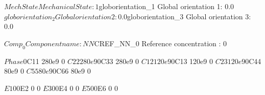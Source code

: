 $MechState  Mechanical State: 1

$globorientation_1 Global orientation 1: 0.0
$globorientation_2 Global orientation 2: 0.0
$globorientation_3 Global orientation 3: 0.0

$Comp_0     Component name              : NN

$CREF_NN_0		Reference concentration		: 0

$Phase 0
$C11 280e9  0
$C22 280e9  0
$C33 280e9  0
$C12 120e9  0
$C13 120e9  0
$C23 120e9  0
$C44 80e9   0
$C55 80e9   0
$C66 80e9   0
 
$E1 0   0
$E2 0   0
$E3 0   0
$E4 0   0
$E5 0   0
$E6 0   0